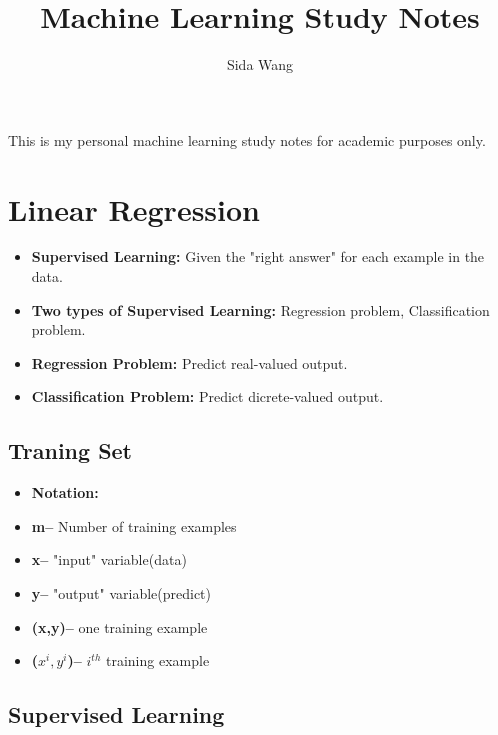 \documentclass[12pt]{article}
\title{\textbf{Machine Learning Study Notes}}
\author{Sida Wang}
\begin{document}
\maketitle
This is my personal machine learning study notes for academic purposes only.

\newpage

\section* {Linear Regression}
\begin{itemize}
\item \textbf{Supervised Learning:} Given the "right answer" for each example in the data.
\item \textbf{Two types of Supervised Learning:} Regression problem,     Classification problem.
\item \textbf{Regression Problem:} Predict real-valued output.
\item \textbf{Classification Problem:} Predict dicrete-valued output.
\end{itemize}

\subsection* {Traning Set}
 
\begin{itemize}
\item \textbf{Notation:} 
\item \textbf{m--} Number of training examples
\item \textbf{x--} "input" variable(data)
\item \textbf{y--} "output" variable(predict)
\item \textbf{(x,y)--} one training example
\item \textbf{($x^i,y^i$)--} $i^{th}$ training example
\end{itemize}

\subsection* {Supervised Learning}
\end{document}
